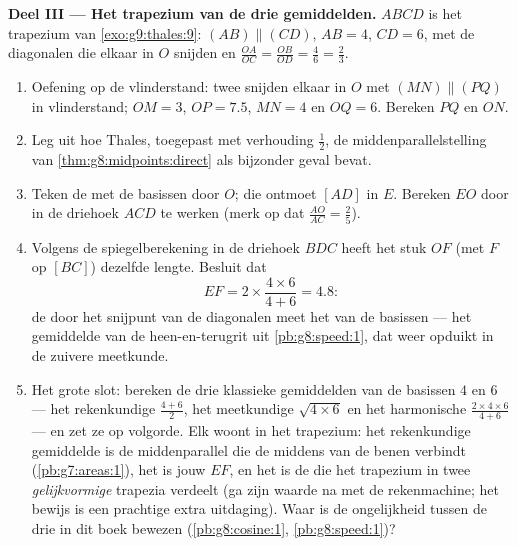 \begin{problem}
\medskip
\noindent\textbf{Deel III --- Het trapezium van de drie gemiddelden.}
$ABCD$ is het trapezium van \cref{exo:g9:thales:9}: $(AB) \parallel (CD)$,
$AB = 4$, $CD = 6$, met de diagonalen die elkaar in $O$ snijden en
$\frac{OA}{OC} = \frac{OB}{OD} = \frac{4}{6} = \frac23$.
\begin{enumerate}[resume]
  \item Oefening op de vlinderstand: twee  snijden elkaar in $O$ met
        $(MN) \parallel (PQ)$ in vlinderstand; $OM = 3$, $OP = 7.5$, $MN = 4$ en
        $OQ = 6$. Bereken $PQ$ en $ON$.
  \item Leg uit hoe Thales, toegepast met verhouding $\frac12$, de
        middenparallelstelling van \cref{thm:g8:midpoints:direct} als bijzonder
        geval bevat.
  \item Teken de  met de basissen door $O$; die ontmoet $[AD]$ in $E$.
        Bereken $EO$ door in de driehoek $ACD$ te werken (merk op dat
        $\frac{AO}{AC} = \frac25$).
  \item Volgens de spiegelberekening in de driehoek $BDC$ heeft het stuk $OF$ (met
        $F$ op $[BC]$) dezelfde lengte. Besluit dat
        \[
        EF = 2 \times \frac{4 \times 6}{4 + 6} = 4.8 :
        \]
        de  door het snijpunt van de diagonalen meet het \emph{} van de basissen --- het gemiddelde van de heen-en-terugrit uit
        \cref{pb:g8:speed:1}, dat weer opduikt in de zuivere meetkunde.
  \item Het grote slot: bereken de drie klassieke gemiddelden van de basissen $4$
        en $6$ --- het rekenkundige $\frac{4+6}{2}$, het meetkundige
        $\sqrt{4 \times 6}$ en het harmonische $\frac{2 \times 4 \times 6}{4 + 6}$
        --- en zet ze op volgorde. Elk woont in het trapezium: het rekenkundige
        gemiddelde is de middenparallel die de middens van de benen verbindt
        (\cref{pb:g7:areas:1}), het  is jouw  $EF$, en
        het  is de  die het trapezium in twee
        \emph{gelijkvormige} trapezia verdeelt (ga zijn waarde na met de
        rekenmachine; het bewijs is een prachtige extra uitdaging). Waar is de
        ongelijkheid tussen de drie in dit boek bewezen
        (\cref{pb:g8:cosine:1}, \cref{pb:g8:speed:1})?
\end{enumerate}
\end{problem}
